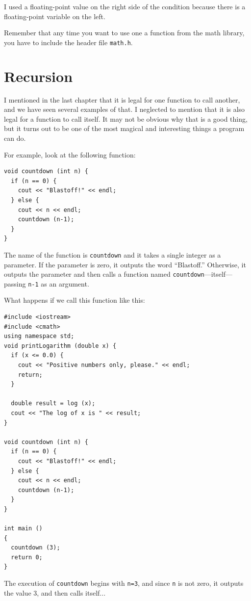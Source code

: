 I used a floating-point value on the right side of the condition
because there is a floating-point variable on the left.

Remember that any time you want to use one a function from the math
library, you have to include the header file {\tt math.h}.

\section{Recursion}
\label{recursion}

I mentioned in the last chapter that it is legal for one function to
call another, and we have seen several examples of that.  I neglected
to mention that it is also legal for a function to call itself.  It
may not be obvious why that is a good thing, but it turns out to be
one of the most magical and interesting things a program can do.

For example, look at the following function:

\begin{verbatim}
void countdown (int n) {
  if (n == 0) {
    cout << "Blastoff!" << endl;
  } else {
    cout << n << endl;
    countdown (n-1);
  }
}
\end{verbatim}
%
The name of the function is {\tt countdown} and it takes a single
integer as a parameter.  If the parameter is zero, it outputs
the word ``Blastoff.''  Otherwise, it outputs the parameter and
then calls a function named {\tt countdown}---itself---passing
{\tt n-1} as an argument.

What happens if we call this function like this:

\begin{verbatim}
#include <iostream>
#include <cmath>
using namespace std;
void printLogarithm (double x) {
  if (x <= 0.0) {
    cout << "Positive numbers only, please." << endl;
    return;
  }

  double result = log (x);
  cout << "The log of x is " << result;
}

void countdown (int n) {
  if (n == 0) {
    cout << "Blastoff!" << endl;
  } else {
    cout << n << endl;
    countdown (n-1);
  }
}

int main ()
{
  countdown (3);
  return 0;
}
\end{verbatim}
%
The execution of {\tt countdown} begins with {\tt n=3}, and
since {\tt n} is not zero, it outputs the value 3, and then
calls itself...

